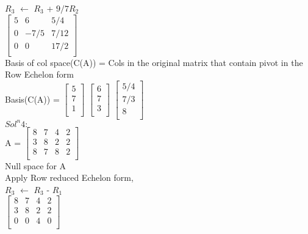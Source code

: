 \documentclass{article}
\begin{document}
$R_3$ $\leftarrow$ $R_3$ + $9/7R_2$\\

$\begin{bmatrix}
    5 & 6 & 5/4\\
    0 & -7/5 & 7/12 \\
    0 & 0 & 17/2  \\
    \end{bmatrix}$ \\

Basis of col space(C(A)) = Cols in the original matrix that contain pivot in the Row Echelon form \\

Basis(C(A)) = $\begin{bmatrix}
    5 \\
    7 \\
    1 \\
    \end{bmatrix}$   $\begin{bmatrix}
    6 \\
    7 \\
    3 \\
    \end{bmatrix}$  $\begin{bmatrix}
    5/4 \\
    7/3 \\
    8 \\
    \end{bmatrix}$ \\
    
$Sol^n 4:$ \\

A = $\begin{bmatrix}
    8 & 7 & 4 & 2\\
    3 & 8 & 2 & 2 \\
    8 & 7 & 8 & 2  \\
    \end{bmatrix}$ \\
    
    Null space for A\\

Apply Row reduced Echelon form,\\

$R_3$ $\leftarrow$ $R_3$ - $R_1$\\

$\begin{bmatrix}
    8 & 7 & 4 & 2\\
    3 & 8 & 2 & 2 \\
    0 & 0 & 4 & 0  \\
    \end{bmatrix}$ \\
    
\end{document}
